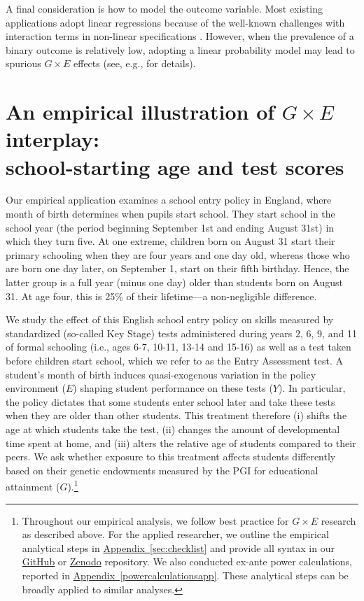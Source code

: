 \documentclass[12pt,a4paper]{article}
\begin{document}
\begin{bibunit}
A final consideration is how to model the outcome variable. Most existing applications adopt linear regressions because of the well-known challenges with interaction terms in non-linear specifications \citep{ai2003interaction}. However, when the prevalence of a binary outcome is relatively low, adopting a linear probability model may lead to spurious $G \times E$ effects (see, e.g., \citet{domingue2020interactions,domingue2022ubiquitous} for details).

\section{An empirical illustration of \texorpdfstring{$G \times E$}{} interplay: \\
school-starting age and test scores} 
\label{sec:application}
Our empirical application examines a school entry policy in England, where month of birth determines when pupils start school. 
They start school in the school year (the period beginning September 1st and ending August 31st) in which they turn five. 
At one extreme, children born on August 31 start their primary schooling when they are four years and one day old, whereas those who are born one day later, on September 1, start on their fifth birthday. 
Hence, the latter group is a full year (minus one day) older than students born on August 31. 
At age four, this is 25\% of their lifetime---a non-negligible difference.

We study the effect of this English school entry policy on skills measured by standardized (so-called Key Stage) tests administered during years 2, 6, 9, and 11 of formal schooling (i.e., ages 6-7, 10-11, 13-14 and 15-16) as well as a test taken before children start school, which we refer to as the Entry Assessment test.  
A student's month of birth induces quasi-exogenous variation in the policy environment ($E$) shaping student performance on these tests ($Y$). In particular, the policy dictates that some students enter school later and take these tests when they are older than other students. This treatment therefore (i) shifts the age at which students take the test, (ii) changes the amount of developmental time spent at home, and (iii) alters the relative age of students compared to their peers.  We ask whether exposure to this treatment affects students differently based on their genetic endowments measured by the PGI for educational attainment ($G$).\footnote{Throughout our empirical analysis, we follow best practice for $G \times E$ research as described above. 
For the applied researcher, we outline the empirical analytical steps in \hyperref[sec:checklist]{Appendix~\ref*{sec:checklist}} and provide all syntax in our \href{http://github.com/geighei/GxE_4practitioners}{GitHub} or \href{https://zenodo.org/records/14968164}{Zenodo} repository. We also conducted ex-ante power calculations, reported in \hyperref[powercalculationsapp]{Appendix~\ref*{powercalculationsapp}}. These analytical steps can be broadly applied to similar analyses.} 


\end{bibunit}
\end{document}

